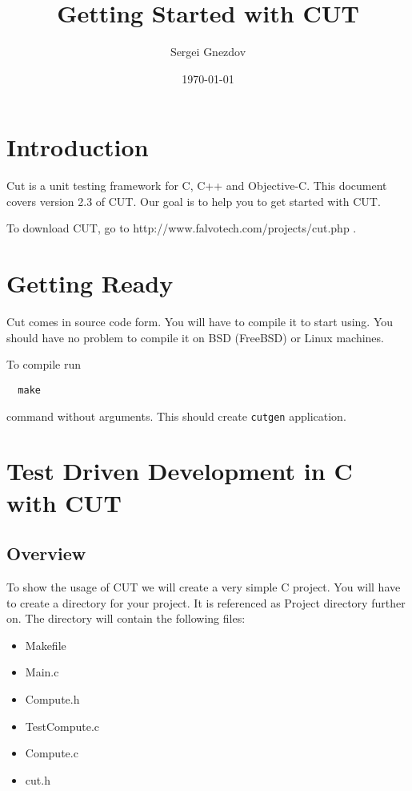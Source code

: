 \documentclass[a4paper,12pt]{article}
\begin{document}
\title{Getting Started with CUT}
\author{Sergei Gnezdov}
\date{\today}
\maketitle

\section{Introduction}

Cut is a unit testing framework for C, C++ and Objective-C.  This
document covers version 2.3 of CUT.  Our goal is to help you to get
started with CUT.

To download CUT, go to http://www.falvotech.com/projects/cut.php .

\section{Getting Ready}

Cut comes in source code form.  You will have to compile it to start
using.  You should have no problem to compile it on BSD (FreeBSD) or
Linux machines.

To compile run
\begin{verbatim}
  make
\end{verbatim}
command without arguments.  This should create \verb|cutgen| application.

\section{Test Driven Development in C with CUT}

\subsection{Overview}

To show the usage of CUT we will create a very simple C project.
You will have to create a directory for your project.  It is
referenced as Project directory further on.  The directory will
contain the following files:

\begin{itemize}
\item Makefile
\item Main.c
\item Compute.h
\item TestCompute.c
\item Compute.c
\item cut.h
\end{itemize}
\end{document}
